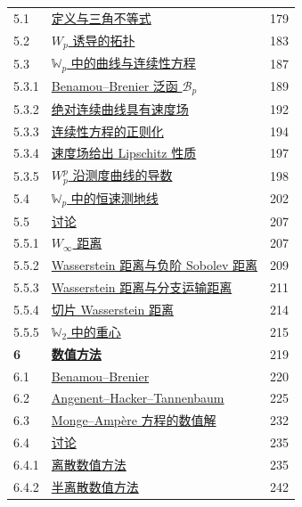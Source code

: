 \begin{longtable}{@{}p{1.4cm}p{11.2cm}r@{}}
5.1&\hyperref[sec:5.1]{定义与三角不等式}&179\\
5.2&\hyperref[sec:5.2]{$W_p$ 诱导的拓扑}&183\\
5.3&\hyperref[sec:5.3]{$\mathbb W_p$ 中的曲线与连续性方程}&187\\
5.3.1&\hyperref[sec:5.3.1]{\hspace{1em}Benamou--Brenier 泛函 $\mathscr B_p$}&189\\
5.3.2&\hyperref[sec:5.3.2]{\hspace{1em}绝对连续曲线具有速度场}&192\\
5.3.3&\hyperref[sec:5.3.3]{\hspace{1em}连续性方程的正则化}&194\\
5.3.4&\hyperref[sec:5.3.4]{\hspace{1em}速度场给出 Lipschitz 性质}&197\\
5.3.5&\hyperref[sec:5.3.5]{\hspace{1em}$W_p^p$ 沿测度曲线的导数}&198\\
5.4&\hyperref[sec:5.4]{$\mathbb W_p$ 中的恒速测地线}&202\\
5.5&\hyperref[sec:5.5]{讨论}&207\\
5.5.1&\hyperref[sec:5.5.1]{\hspace{1em}$W_\infty$ 距离}&207\\
5.5.2&\hyperref[sec:5.5.2]{\hspace{1em}Wasserstein 距离与负阶 Sobolev 距离}&209\\
5.5.3&\hyperref[sec:5.5.3]{\hspace{1em}Wasserstein 距离与分支运输距离}&211\\
5.5.4&\hyperref[sec:5.5.4]{\hspace{1em}切片 Wasserstein 距离}&214\\
5.5.5&\hyperref[sec:5.5.5]{\hspace{1em}$\mathbb W_2$ 中的重心}&215\\
\textbf{6}&\hyperref[sec:6]{\textbf{数值方法}}&219\\
6.1&\hyperref[sec:6.1]{Benamou--Brenier}&220\\
6.2&\hyperref[sec:6.2]{Angenent--Hacker--Tannenbaum}&225\\
6.3&\hyperref[sec:6.3]{Monge--Amp\`ere 方程的数值解}&232\\
6.4&\hyperref[sec:6.4]{讨论}&235\\
6.4.1&\hyperref[sec:6.4.1]{\hspace{1em}离散数值方法}&235\\
6.4.2&\hyperref[sec:6.4.2]{\hspace{1em}半离散数值方法}&242\\

\end{longtable}
